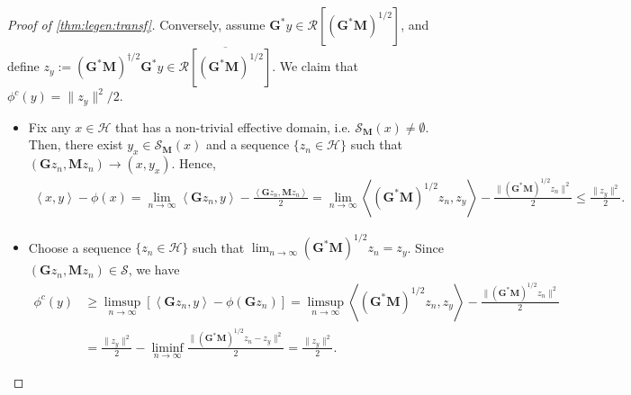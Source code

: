 \documentclass[noinfoline]{imsart}\setcounter{tocdepth}{2}
\newcommand{\m}[1]{\mathbf{#1}} %
\renewcommand{\c}[1]{\mathcal{#1}} %
\newcommand{\innpr}[2]{{\left\langle {#1},{#2}\right\rangle}} %
\theoremstyle{plain}
\begin{document}
\begin{proof}[Proof of \cref{thm:legen:transf}]
Conversely, assume $\m{G}^{*} y \in \c{R}[(\m{G}^{*} \m{M})^{1/2}]$, and define $z_{y} := (\m{G}^{*} \m{M})^{\dagger/2} \m{G}^{*} y \in \overline{\c{R}[(\m{G}^{*} \m{M})^{1/2}]}$. We claim that $\phi^{c}(y)= \|z_{y}\|^{2}/2$.
\begin{itemize}[leftmargin = *]
\item [($\le$)] Fix any $x \in \c{H}$ that has a non-trivial effective domain, i.e. $\c{S}_{\m{M}}(x) \ne \emptyset$. Then, there exist $y_{x} \in \c{S}_{\m{M}}(x)$ and a sequence $\{z_{n} \in \c{H}\}$ such that $(\m{G} z_{n}, \m{M} z_{n}) \to (x, y_{x})$. Hence,
\begin{align*}
    \innpr{x}{y} - \phi(x) = \lim_{n \to \infty} \innpr{\m{G} z_{n}}{y} - \frac{\innpr{\m{G} z_{n}}{\m{M} z_{n}}}{2} = \lim_{n \to \infty} \innpr{(\m{G}^{*} \m{M})^{1/2} z_{n}}{z_{y}} - \frac{\|(\m{G}^{*} \m{M})^{1/2} z_{n}\|^{2}}{2}
    \le \frac{\|z_{y}\|^{2}}{2}.
\end{align*}

\item [($\ge$)] Choose a sequence $\{z_{n} \in \c{H} \}$ such that $\lim_{n \to \infty} (\m{G}^{*} \m{M})^{1/2} z_{n} = z_{y}$. Since $(\m{G} z_{n}, \m{M} z_{n}) \in \c{S}$, we have
\begin{align*}
    \phi^{c}(y) &\ge \limsup_{n \to \infty} [\innpr{\m{G} z_{n}}{y} - \phi(\m{G} z_{n})] = \limsup_{n \to \infty} \innpr{(\m{G}^{*} \m{M})^{1/2} z_{n}}{z_{y}} - \frac{\|(\m{G}^{*} \m{M})^{1/2} z_{n}\|^{2}}{2} \\
    &= \frac{\|z_{y}\|^{2}}{2} - \liminf_{n \to \infty} \frac{\|(\m{G}^{*} \m{M})^{1/2} z_{n} - z_{y}\|^{2}}{2} = \frac{\|z_{y}\|^{2}}{2}.
\end{align*}
\end{itemize}
\end{proof}
\end{document}
